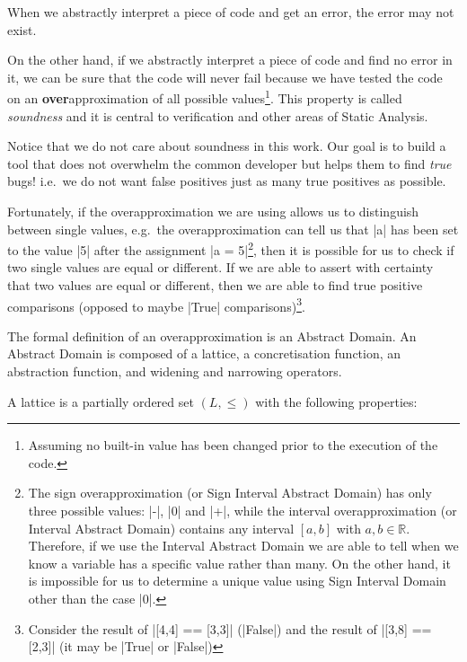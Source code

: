 When we abstractly interpret a piece of code and get an error, the error may not exist.

On the other hand, if we abstractly interpret a piece of code and find no error in it, we
can be sure that the code will never fail because we have tested the code on an
\textbf{over}approximation of all possible values\footnote{Assuming no built-in value has
  been changed prior to the execution of the code.}. This property is called
\emph{soundness} and it is central to verification and other areas of Static Analysis.

Notice that we do not care about soundness in this work. Our goal is to
build a tool that does not overwhelm the common developer but helps them
to find \emph{true} bugs! i.e.~we do not want false positives just as
many true positives as possible.

Fortunately, if the overapproximation we are using allows us to
distinguish between single values, e.g.~the overapproximation can tell
us that \pycode|a| has been set to the value \pycode|5| after the
assignment \pycode|a = 5|\footnote{The sign overapproximation (or
  Sign Interval Abstract Domain) has only three possible values:
  \pycode|-|, \pycode|0| and \pycode|+|, while the interval
  overapproximation (or Interval Abstract Domain) contains any interval
  \([a,b]\) with \(a,b \in \mathbb{R}\). Therefore, if we use the
  Interval Abstract Domain we are able to tell when we know a variable
  has a specific value rather than many. On the other hand, it is
  impossible for us to determine a unique value using Sign Interval
  Domain other than the case \pycode|0|.}, then it is possible for us to
check if two single values are equal or different. If we are able to
assert with certainty that two values are equal or different, then we
are able to find true positive comparisons (opposed to maybe
\pycode|True| comparisons)\footnote{Consider the result of
  \pycode|[4,4] == [3,3]| (\pycode|False|) and the result of
  \pycode|[3,8] == [2,3]| (it may be \pycode|True| or
  \pycode|False|)}.

The formal definition of an overapproximation is an Abstract Domain. An Abstract Domain is
composed of a lattice, a concretisation function, an abstraction function,
 and widening and narrowing operators.

A lattice is a partially ordered set \((L, \le)\) with the following properties:

